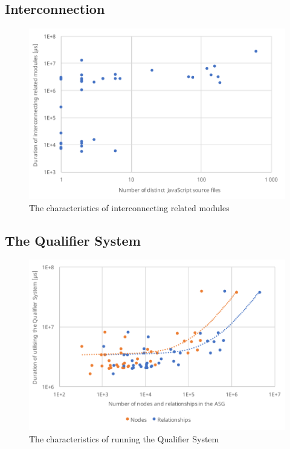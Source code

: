 \subsection{Interconnection}

\begin{figure}[!htb]
	\centerfloat
	\includegraphics[width=\textwidth,clip]{figures/measurement-interconnecttime-modules.pdf}
	\caption{The characteristics of interconnecting related modules}
	\label{fig:measurement-interconnecttime-modules}
\end{figure}


\subsection{The Qualifier System}

\begin{figure}[!htb]
	\centerfloat
	\includegraphics[width=\textwidth,clip]{figures/measurement-qualifiersystem-nodes-relationships.pdf}
	\caption{The characteristics of running the Qualifier System}
	\label{fig:measurement-qualifiersystem-nodes-relationships}
\end{figure}


